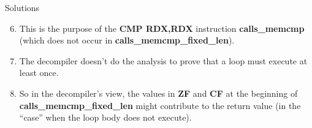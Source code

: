 \documentclass{beamer}
\begin{document}
\begin{frame}
\begin{block}{Solutions}
\begin{enumerate}
\setcounter{enumi}{5}
\item This is the purpose of the \textbf{CMP RDX,RDX} instruction \textbf{calls\_memcmp} (which does not occur in \textbf{calls\_memcmp\_fixed\_len}).
\item The decompiler doesn't do the analysis to prove that a loop must execute at least once.
\item So in the decompiler's view, the values in \textbf{ZF} and \textbf{CF} at the beginning of \textbf{calls\_memcmp\_fixed\_len} might contribute to the return value (in the ``case''
 when the loop body does not execute).
\end{enumerate}
\end{block}
\end{frame}
\end{document}
